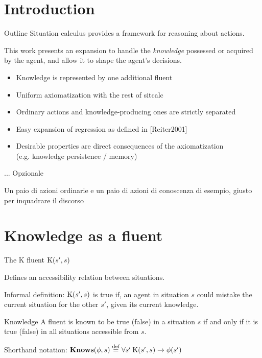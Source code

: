 
\section{Introduction}

\begin{frame}{Outline}
    Situation calculus provides a framework for reasoning about actions.

    This work presents an expansion to handle the \textit{knowledge} possessed or acquired by the agent,
    and allow it to shape the agent's decisions.
    \begin{itemize}%
        \item Knowledge is represented by one additional fluent
        \item Uniform axiomatization with the rest of sitcalc
        \item Ordinary actions and knowledge-producing ones are strictly separated
        \item Easy expansion of regression as defined in [Reiter2001]
        \item Desirable properties are direct consequences of the axiomatization \\
                (e.g. knowledge persistence / memory)
    \end{itemize}
\end{frame}

\begin{frame}{...}
    Opzionale

    Un paio di azioni ordinarie e un paio di azioni di conoscenza di esempio, giusto per inquadrare il discorso
\end{frame}

\section{Knowledge as a fluent}

\begin{frame}{The K fluent}
    \( \text{K}(s', s) \)

    Defines an accessibility relation between situations.


    Informal definition: \( \text{K}(s',s) \) is true if, an agent in situation \(s\)
    could mistake the current situation for the other \(s'\), given its current knowledge.
\end{frame}

\begin{frame}{Knowledge}
    A fluent is known to be true (false) in a situation \(s\) if and only if it is true (false)
    in all situations accessible from \(s\).

    Shorthand notation: \( \textbf{Knows}(\phi, s) \stackrel{\text{def}}{=} \forall s' \: \text{K}(s',s) \rightarrow \phi(s') \)
\end{frame}
